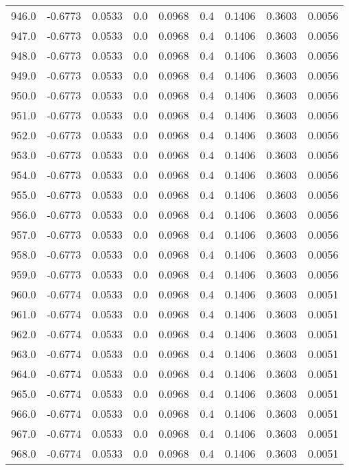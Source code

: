 \begin{longtable}{lrrrrrrrr}
946.0 & -0.6773 & 0.0533 & 0.0 & 0.0968 & 0.4 & 0.1406 & 0.3603 & 0.0056 \\
947.0 & -0.6773 & 0.0533 & 0.0 & 0.0968 & 0.4 & 0.1406 & 0.3603 & 0.0056 \\
948.0 & -0.6773 & 0.0533 & 0.0 & 0.0968 & 0.4 & 0.1406 & 0.3603 & 0.0056 \\
949.0 & -0.6773 & 0.0533 & 0.0 & 0.0968 & 0.4 & 0.1406 & 0.3603 & 0.0056 \\
950.0 & -0.6773 & 0.0533 & 0.0 & 0.0968 & 0.4 & 0.1406 & 0.3603 & 0.0056 \\
951.0 & -0.6773 & 0.0533 & 0.0 & 0.0968 & 0.4 & 0.1406 & 0.3603 & 0.0056 \\
952.0 & -0.6773 & 0.0533 & 0.0 & 0.0968 & 0.4 & 0.1406 & 0.3603 & 0.0056 \\
953.0 & -0.6773 & 0.0533 & 0.0 & 0.0968 & 0.4 & 0.1406 & 0.3603 & 0.0056 \\
954.0 & -0.6773 & 0.0533 & 0.0 & 0.0968 & 0.4 & 0.1406 & 0.3603 & 0.0056 \\
955.0 & -0.6773 & 0.0533 & 0.0 & 0.0968 & 0.4 & 0.1406 & 0.3603 & 0.0056 \\
956.0 & -0.6773 & 0.0533 & 0.0 & 0.0968 & 0.4 & 0.1406 & 0.3603 & 0.0056 \\
957.0 & -0.6773 & 0.0533 & 0.0 & 0.0968 & 0.4 & 0.1406 & 0.3603 & 0.0056 \\
958.0 & -0.6773 & 0.0533 & 0.0 & 0.0968 & 0.4 & 0.1406 & 0.3603 & 0.0056 \\
959.0 & -0.6773 & 0.0533 & 0.0 & 0.0968 & 0.4 & 0.1406 & 0.3603 & 0.0056 \\
960.0 & -0.6774 & 0.0533 & 0.0 & 0.0968 & 0.4 & 0.1406 & 0.3603 & 0.0051 \\
961.0 & -0.6774 & 0.0533 & 0.0 & 0.0968 & 0.4 & 0.1406 & 0.3603 & 0.0051 \\
962.0 & -0.6774 & 0.0533 & 0.0 & 0.0968 & 0.4 & 0.1406 & 0.3603 & 0.0051 \\
963.0 & -0.6774 & 0.0533 & 0.0 & 0.0968 & 0.4 & 0.1406 & 0.3603 & 0.0051 \\
964.0 & -0.6774 & 0.0533 & 0.0 & 0.0968 & 0.4 & 0.1406 & 0.3603 & 0.0051 \\
965.0 & -0.6774 & 0.0533 & 0.0 & 0.0968 & 0.4 & 0.1406 & 0.3603 & 0.0051 \\
966.0 & -0.6774 & 0.0533 & 0.0 & 0.0968 & 0.4 & 0.1406 & 0.3603 & 0.0051 \\
967.0 & -0.6774 & 0.0533 & 0.0 & 0.0968 & 0.4 & 0.1406 & 0.3603 & 0.0051 \\
968.0 & -0.6774 & 0.0533 & 0.0 & 0.0968 & 0.4 & 0.1406 & 0.3603 & 0.0051 \\

\end{longtable}
